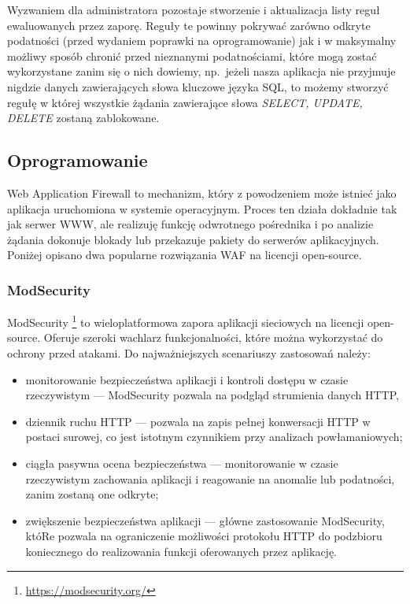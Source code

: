 \documentclass[11pt,a4paper,polish,thesis]{dcsbook}
\begin{document}
Wyzwaniem dla administratora pozostaje stworzenie i aktualizacja listy reguł ewaluowanych przez zaporę. Reguły te powinny pokrywać zarówno odkryte podatności (przed wydaniem poprawki na oprogramowanie) jak i w maksymalny możliwy sposób chronić przed nieznanymi podatnościami, które mogą zostać wykorzystane zanim się o nich dowiemy, np.~jeżeli nasza aplikacja nie przyjmuje nigdzie danych zawierających słowa kluczowe języka SQL, to możemy stworzyć regułę w której wszystkie żądania zawierające słowa \textit{SELECT, UPDATE, DELETE} zostaną zablokowane.

\subsection{Oprogramowanie}
Web Application Firewall to mechanizm, który z powodzeniem może istnieć jako aplikacja uruchomiona w systemie operacyjnym. Proces ten działa dokładnie tak jak serwer WWW, ale realizuję funkcję odwrotnego pośrednika i po analizie żądania dokonuje blokady lub przekazuje pakiety do serwerów aplikacyjnych. Poniżej opisano dwa popularne rozwiązania WAF na licencji open-source.

\subsubsection{ModSecurity}
ModSecurity \footnote{\url{https://modsecurity.org/}} to wieloplatformowa zapora aplikacji sieciowych na licencji open-source. Oferuje szeroki wachlarz funkcjonalności, które można wykorzystać do ochrony przed atakami. Do najważniejszych scenariuszy zastosowań należy:
\begin{itemize} 
\item monitorowanie bezpieczeństwa aplikacji i kontroli dostępu w czasie rzeczywistym --- ModSecurity pozwala na podgląd strumienia danych HTTP,
\item dziennik ruchu HTTP --- pozwala na zapis pełnej konwersacji HTTP w postaci surowej, co jest istotnym czynnikiem przy analizach powłamaniowych;
\item ciągła pasywna ocena bezpieczeństwa --- monitorowanie w czasie rzeczywistym zachowania aplikacji i reagowanie na anomalie lub podatności, zanim zostaną one odkryte;
\item zwiększenie bezpieczeństwa aplikacji --- główne zastosowanie ModSecurity, któRe pozwala na ograniczenie możliwości protokołu HTTP do podzbioru koniecznego do realizowania funkcji oferowanych przez aplikację.
\end{itemize}
\end{document}
